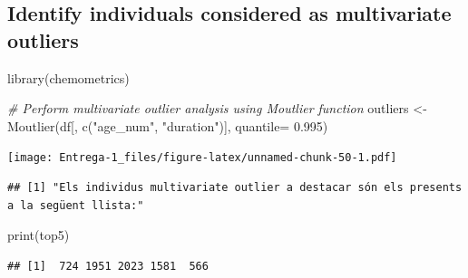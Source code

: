 \documentclass[
]{article}
\newenvironment{Shaded}{\begin{snugshade}}{\end{snugshade}}
\newcommand{\AttributeTok}[1]{\textcolor[rgb]{0.77,0.63,0.00}{#1}}
\newcommand{\CommentTok}[1]{\textcolor[rgb]{0.56,0.35,0.01}{\textit{#1}}}
\newcommand{\ConstantTok}[1]{\textcolor[rgb]{0.00,0.00,0.00}{#1}}
\newcommand{\DecValTok}[1]{\textcolor[rgb]{0.00,0.00,0.81}{#1}}
\newcommand{\FloatTok}[1]{\textcolor[rgb]{0.00,0.00,0.81}{#1}}
\newcommand{\FunctionTok}[1]{\textcolor[rgb]{0.00,0.00,0.00}{#1}}
\newcommand{\NormalTok}[1]{#1}
\newcommand{\OtherTok}[1]{\textcolor[rgb]{0.56,0.35,0.01}{#1}}
\newcommand{\SpecialCharTok}[1]{\textcolor[rgb]{0.00,0.00,0.00}{#1}}
\newcommand{\StringTok}[1]{\textcolor[rgb]{0.31,0.60,0.02}{#1}}
\begin{document}
\hypertarget{identify-individuals-considered-as-multivariate-outliers}{%
\subsection{Identify individuals considered as multivariate
outliers}\label{identify-individuals-considered-as-multivariate-outliers}}

\begin{Shaded}
\begin{Highlighting}[]
\FunctionTok{library}\NormalTok{(chemometrics)}

\CommentTok{\# Perform multivariate outlier analysis using Moutlier function}
\NormalTok{outliers }\OtherTok{\textless{}{-}} \FunctionTok{Moutlier}\NormalTok{(df[, }\FunctionTok{c}\NormalTok{(}\StringTok{"age\_num"}\NormalTok{, }\StringTok{"duration"}\NormalTok{)], }\AttributeTok{quantile=} \FloatTok{0.995}\NormalTok{)}
\end{Highlighting}
\end{Shaded}

\texttt{[image: Entrega-1\_files/figure-latex/unnamed-chunk-50-1.pdf]}

\begin{Shaded}
\end{Shaded}

\begin{verbatim}
## [1] "Els individus multivariate outlier a destacar són els presents a la següent llista:"
\end{verbatim}

\begin{Shaded}
\begin{Highlighting}[]
\FunctionTok{print}\NormalTok{(top5)}
\end{Highlighting}
\end{Shaded}

\begin{verbatim}
## [1]  724 1951 2023 1581  566
\end{verbatim}

\begin{Shaded}
\end{Shaded}
\end{document}
